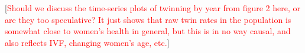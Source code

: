 \documentclass{nature}
\begin{document}
\begin{linenumbers}

[\textcolor{red}{Should we discuss the time-series plots of twinning by year from figure 2 here, or are they too speculative?  It just shows that raw twin rates in the population is somewhat close to women's health in general, but this is in no way causal, and also reflects IVF, changing women's age, etc.}]


\end{linenumbers}
\end{document}
